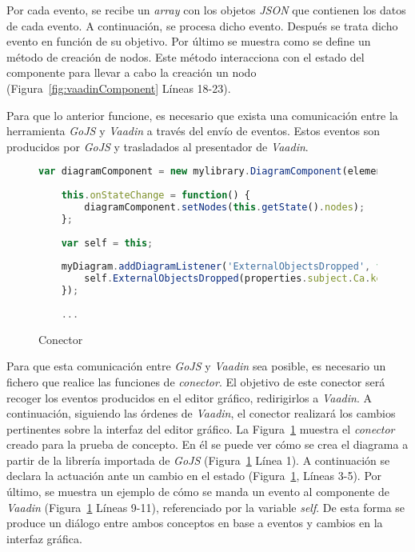 
Por cada evento, se recibe un \emph{array} con los objetos \emph{JSON} que contienen los datos de cada evento. A continuación, se procesa dicho evento. Después se trata dicho evento en función de su objetivo. 
Por último se muestra como se define un método de creación de nodos. Este método interacciona con el estado del componente para llevar a cabo la creación un nodo (Figura~\ref{fig:vaadinComponent} Líneas 18-23).

Para que lo anterior funcione, es necesario que exista una comunicación entre la herramienta \emph{GoJS} y \emph{Vaadin} a través del envío de eventos. Estos eventos son producidos por \emph{GoJS} y trasladados al presentador de \emph{Vaadin}.

\begin{figure}[H]
	\centering
	\begin{lstlisting}[language=Javascript]
	var diagramComponent = new mylibrary.DiagramComponent(element);
	
	this.onStateChange = function() {
		diagramComponent.setNodes(this.getState().nodes);
	};
	
	var self = this;
	
	myDiagram.addDiagramListener('ExternalObjectsDropped', function(properties) {
		self.ExternalObjectsDropped(properties.subject.Ca.key.Vd);
	});
	
	...\end{lstlisting}
	\caption{Conector}
	\label{fig:connector}
\end{figure}

Para que esta comunicación entre \emph{GoJS} y \emph{Vaadin} sea posible, es necesario un fichero que realice las funciones de \emph{conector}. El objetivo de este conector será recoger los eventos producidos en el editor gráfico, redirigirlos a \emph{Vaadin}. A continuación, siguiendo las órdenes de \emph{Vaadin}, el conector realizará los cambios pertinentes sobre la interfaz del editor gráfico. La Figura~\ref{fig:connector} muestra el \emph{conector} creado para la prueba de concepto. En él se puede ver cómo se crea el diagrama a partir de la librería importada de \emph{GoJS} (Figura~\ref{fig:connector} Línea 1). A continuación se declara la actuación ante un cambio en el estado (Figura~\ref{fig:connector}, Líneas 3-5). Por último, se muestra un ejemplo de cómo se manda un evento al componente de \emph{Vaadin} (Figura~\ref{fig:connector} Líneas 9-11), referenciado por la variable \emph{self}. De esta forma se produce un diálogo entre ambos conceptos en base a eventos y cambios en la interfaz gráfica.


